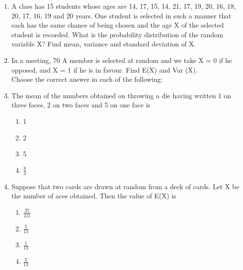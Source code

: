 \documentclass[12pt]{article}
\begin{document}
\begin{enumerate}
\item A class has 15 students whose ages are 14, 17, 15, 14, 21, 17, 19, 20, 16, 18, 20,
17, 16, 19 and 20 years. One student is selected in such a manner that each has
the same chance of being chosen and the age X of the selected student is
recorded. What is the probability distribution of the random variable X? Find
mean, variance and standard deviation of X.

\item In a meeting, 70%
A member is selected at random and we take X = 0 if he opposed, and X = 1 if
he is in favour. Find E(X) and Var (X).\\

Choose the correct answer in each of the following:



\item The mean of the numbers obtained on throwing a die having written 1 on three
faces, 2 on two faces and 5 on one face is
\begin{enumerate}[label=\alph*]
\item 1
\item 2
\item 5
\item $\frac{8}{3}$

\end{enumerate}

\item Suppose that two cards are drawn at random from a deck of cards. Let X be the
number of aces obtained. Then the value of E(X) is
\begin{enumerate}[label=\Alph*]

\item $\frac{37}{221}$
\item $\frac{5}{13}$
\item $\frac{1}{13}$
\item $\frac{2}{13}$

\end{enumerate}

\end{enumerate}
\end{document}
